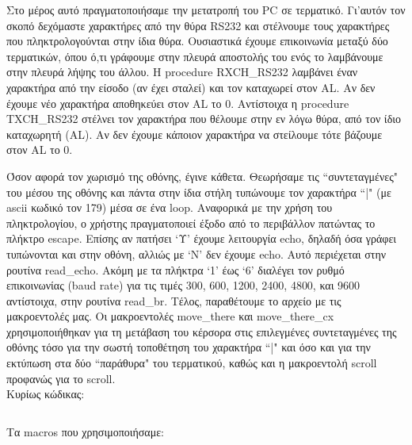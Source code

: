 \documentclass[a4paper,10pt]{article} \usepackage{anysize}
\begin{document}
 Στο μέρος αυτό πραγματοποιήσαμε την μετατροπή του PC σε τερματικό. Γι'αυτόν
 τον σκοπό δεχόμαστε χαρακτήρες από την θύρα RS232 και
 στέλνουμε τους χαρακτήρες που πληκτρολογούνται στην ίδια θύρα. Ουσιαστικά
 έχουμε επικοινωνία μεταξύ δύο τερματικών, όπου ό,τι γράφουμε στην πλευρά
 αποστολής του ενός το λαμβάνουμε στην πλευρά λήψης του άλλου.
 Η procedure RXCH\_RS232 λαμβάνει έναν χαρακτήρα από
 την είσοδο (αν έχει σταλεί) και τον καταχωρεί στον AL. Αν δεν έχουμε νέο
 χαρακτήρα αποθηκεύει στον AL το 0. Αντίστοιχα η procedure TXCH\_RS232
 στέλνει τον χαρακτήρα που θέλουμε στην εν λόγω θύρα, από τον ίδιο
 καταχωρητή (AL). Αν δεν έχουμε κάποιον χαρακτήρα να στείλουμε τότε βάζουμε στον AL
 το 0.

 Όσον αφορά τον χωρισμό της οθόνης, έγινε κάθετα. Θεωρήσαμε τις
 ``συντεταγμένες" του μέσου της οθόνης και πάντα στην ίδια στήλη τυπώνουμε τον
 χαρακτήρα ``|" (με ascii κωδικό τον 179) μέσα σε ένα loop.
 Αναφορικά με την χρήση του πληκτρολογίου, ο χρήστης πραγματοποιεί έξοδο από
 το περιβάλλον πατώντας το πλήκτρο escape. Επίσης αν πατήσει `Υ' έχουμε
 λειτουργία echo, δηλαδή όσα γράφει τυπώνονται και στην οθόνη, αλλιώς με `N'
 δεν έχουμε echo. Αυτό περιέχεται στην ρουτίνα read\_echo. Ακόμη με τα πλήκτρα
 `1' έως `6' διαλέγει τον ρυθμό επικοινωνίας (baud rate) για τις τιμές 300,
 600, 1200, 2400, 4800, και 9600 αντίστοιχα, στην ρουτίνα read\_br.
 Τέλος, παραθέτουμε το αρχείο με τις μακροεντολές μας. Οι μακροεντολές
 move\_there και move\_there\_cx χρησιμοποιήθηκαν για τη μετάβαση του κέρσορα
 στις επιλεγμένες συντεταγμένες της οθόνης τόσο για την σωστή τοποθέτηση του 
 χαρακτήρα ``|" και όσο και για την εκτύπωση στα δύο ``παράθυρα" του
 τερματικού, καθώς και η μακροεντολή scroll προφανώς για το scroll.\\[0.5cm]

\noindent Κυρίως κώδικας:
\inputminted[linenos,obeytabs,fontsize=\footnotesize]{nasm}{files/2.asm}
Τα macros που χρησιμοποιήσαμε:
\inputminted[linenos,obeytabs,fontsize=\footnotesize]{nasm}{files/2.txt}
\end{document}
